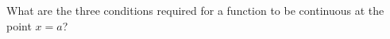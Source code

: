 \documentclass{siproblemset}
\begin{document}
    \smallspace

    \begin{multipartquestion}
        What are the three conditions required for a function to be continuous at the point $x=a$?
        \frq{}
        \tinyspace
        \frq{}
        \tinyspace
        \frq{}
    \end{multipartquestion}
\end{document}
